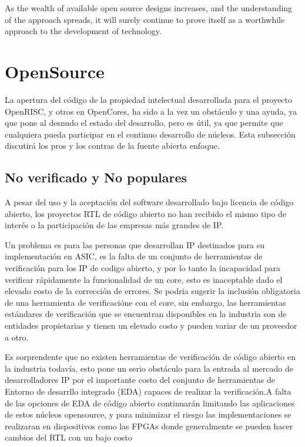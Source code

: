 As the wealth of available open source designs increases, and the understanding of the approach spreads, it will surely continue to prove itself as a worthwhile approach to the development of technology.

\section{ OpenSource}

La apertura del código de la propiedad intelectual desarrollada para el proyecto OpenRISC, y otros en OpenCores, ha sido a la vez un obstáculo y una ayuda, ya que pone al desnudo el estado del desarrollo, pero es útil, ya que permite que cualquiera pueda participar en el continuo desarrollo de núcleos. Esta subsección discutirá los pros y los contras de la fuente abierta enfoque.

		\subsection{No verificado y No populares}

A pesar del uso y la aceptación del software desarrollado bajo licencia de código abierto, los proyectos RTL de código abierto no han recibido el mismo tipo de interés o la participación de las empresas más grandes de IP. 

Un problema es para las personas que desarrollan IP destinados para su implementación en ASIC, es la falta de un conjunto de herramientas de verificación para los IP de codigo abierto, y por lo tanto la incapacidad para verificar rápidamente la funcionalidad de un core, esto es inaceptable dado el elevado costo de la corrección de errores. Se podria sugerir la inclusión obligatoria de una herramienta de verificacióne con el core, sin embargo, las herramientas estándares de verificación que se encuentran disponibles en la industria son de entidades propietarias y tienen un elevado costo y pueden variar de un proveedor a otro. 

Es sorprendente que no existen herramientas de verificación de código abierto en la industria todavía, esto pone un serio obstáculo para la entrada al mercado de desarrolladores IP por el importante costo del conjunto de herramientas de Entorno de desarrllo integrado (EDA) capaces de realizar la verificación.A falta de las opciones de EDA de código abierto continuarán limitando las aplicaciones de estos núcleos opensource, y para minimizar el riesgo las implementaciones se realizaran en dispositivos como las FPGAs donde generalmente se pueden hacer cambios  del RTL con un bajo costo 
 

